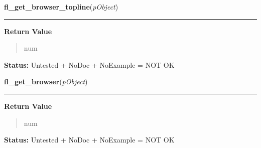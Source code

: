     \label{xformslib:library:fl_get_browser_topline}

    \vspace{0.5ex}

\hspace{.8\funcindent}\begin{boxedminipage}{\funcwidth}

    \raggedright \textbf{fl\_get\_browser\_topline}(\textit{pObject})

    \vspace{-1.5ex}

    \rule{\textwidth}{0.5\fboxrule}
\setlength{\parskip}{2ex}
\setlength{\parskip}{1ex}
      \textbf{Return Value}
    \vspace{-1ex}

      \begin{quote}
      num

      \end{quote}

\textbf{Status:} Untested + NoDoc + NoExample = NOT OK



    \end{boxedminipage}

    \label{xformslib:library:fl_get_browser}

    \vspace{0.5ex}

\hspace{.8\funcindent}\begin{boxedminipage}{\funcwidth}

    \raggedright \textbf{fl\_get\_browser}(\textit{pObject})

    \vspace{-1.5ex}

    \rule{\textwidth}{0.5\fboxrule}
\setlength{\parskip}{2ex}
\setlength{\parskip}{1ex}
      \textbf{Return Value}
    \vspace{-1ex}

      \begin{quote}
      num

      \end{quote}

\textbf{Status:} Untested + NoDoc + NoExample = NOT OK



    \end{boxedminipage}

